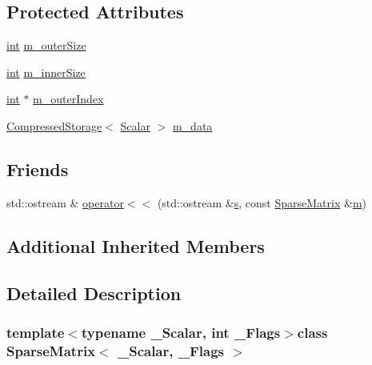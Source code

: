 \subsection*{Protected Attributes}
\begin{DoxyCompactItemize}
\item 
\hyperlink{ioapi_8h_a787fa3cf048117ba7123753c1e74fcd6}{int} \hyperlink{class_sparse_matrix_a99709cdbe631a5c07e4a302a6a136ddb}{m\-\_\-outer\-Size}
\item 
\hyperlink{ioapi_8h_a787fa3cf048117ba7123753c1e74fcd6}{int} \hyperlink{class_sparse_matrix_a4480eac68546e6e51738c5f712a4e0c0}{m\-\_\-inner\-Size}
\item 
\hyperlink{ioapi_8h_a787fa3cf048117ba7123753c1e74fcd6}{int} $\ast$ \hyperlink{class_sparse_matrix_a6a2e46de0361a3b05f7641ece22632f4}{m\-\_\-outer\-Index}
\item 
\hyperlink{class_compressed_storage}{Compressed\-Storage}$<$ \hyperlink{class_sparse_matrix_base_af39d70f2b7e775e9e17b666cd24128c8}{Scalar} $>$ \hyperlink{class_sparse_matrix_a1097b14c8860e0a7f72aa90aab6a7896}{m\-\_\-data}
\end{DoxyCompactItemize}
\subsection*{Friends}
\begin{DoxyCompactItemize}
\item 
std\-::ostream \& \hyperlink{class_sparse_matrix_ae7cb03fccbdb1456601051ffa6522c46}{operator$<$$<$} (std\-::ostream \&\hyperlink{glext_8h_ad585a1393cfa368fa9dc3d8ebff640d5}{s}, const \hyperlink{class_sparse_matrix}{Sparse\-Matrix} \&\hyperlink{glext_8h_af593500c283bf1a787a6f947f503a5c2}{m})
\end{DoxyCompactItemize}
\subsection*{Additional Inherited Members}


\subsection{Detailed Description}
\subsubsection*{template$<$typename \-\_\-\-Scalar, int \-\_\-\-Flags$>$class Sparse\-Matrix$<$ \-\_\-\-Scalar, \-\_\-\-Flags $>$}

